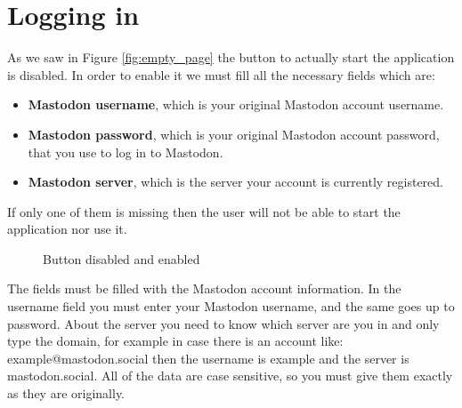 \section{Logging in}
\label{s:Logging_in}
As we saw in Figure \ref{fig:empty_page} the button to actually start the application is disabled.
In order to enable it we must fill all the necessary fields which are:
\begin{itemize}
	\item \textbf{Mastodon username}, which is your original Mastodon account username.
	\item \textbf{Mastodon password}, which is your original Mastodon account password, that you use to log in to Mastodon.
	\item \textbf{Mastodon server}, which is the server your account is currently registered.
\end{itemize}

If only one of them is missing then the user will not be able
to start the application nor use it. 
\begin{figure}[H]
	\centering
	\hspace{5pt}
	\caption{Button disabled and enabled}
	\label{fig:buttonenabled}
\end{figure}
The fields must be filled with the Mastodon account information.
In the username field you must enter your Mastodon username, and the
same goes up to password. About the server you need to know which server
are you in and only type the domain, for example in case there is an account
like: example@mastodon.social then the username is example and the server is
mastodon.social. All of the data are case sensitive, so you must give them
exactly as they are originally.

